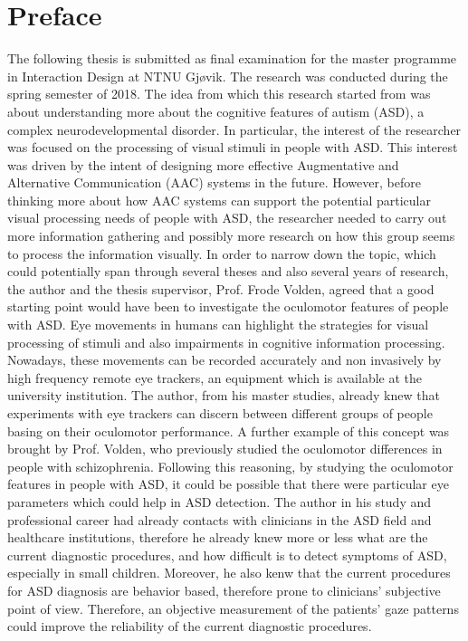 \hypersetup{pageanchor=false}
%

\chapter*{Preface}
The following thesis is submitted as final examination for the master programme in Interaction Design at NTNU Gjøvik. The research was conducted during the spring semester of 2018.
The idea from which this research started from was about understanding more about the cognitive features of autism (ASD), a complex neurodevelopmental disorder. In particular, the interest of the researcher was focused on the processing of visual stimuli in people with ASD. This interest was driven by the intent of designing more effective Augmentative and Alternative Communication (AAC) systems in the future. However, before thinking more about how AAC systems can support the potential particular visual processing needs of people with ASD, the researcher needed to carry out more information gathering and possibly more research on how this group seems to process the information visually.
In order to narrow down the topic, which could potentially span through several theses and also several years of research, the author and the thesis supervisor, Prof. Frode Volden, agreed that a good starting point would have been to investigate the oculomotor features of people with ASD. Eye movements in humans can highlight the strategies for visual processing of stimuli and also impairments in cognitive information processing. Nowadays, these movements can be recorded accurately and non invasively by high frequency remote eye trackers, an equipment which is available at the university institution.
The author, from his master studies, already knew that experiments with eye trackers can discern between different groups of people basing on their oculomotor performance. A further example of this concept was brought by Prof. Volden, who previously studied the oculomotor differences in people with schizophrenia. Following this reasoning, by studying the oculomotor features in people with ASD, it could be possible that there were particular eye parameters which could help in ASD detection.
The author in his study and professional career had already contacts with clinicians in the ASD field and healthcare institutions, therefore he already knew more or less what are the current diagnostic procedures, and how difficult is to detect symptoms of ASD, especially in small children. Moreover, he also kenw that the current procedures for ASD diagnosis are behavior based, therefore prone to clinicians' subjective point of view. Therefore, an objective measurement of the patients' gaze patterns could improve the reliability of the current diagnostic procedures.
